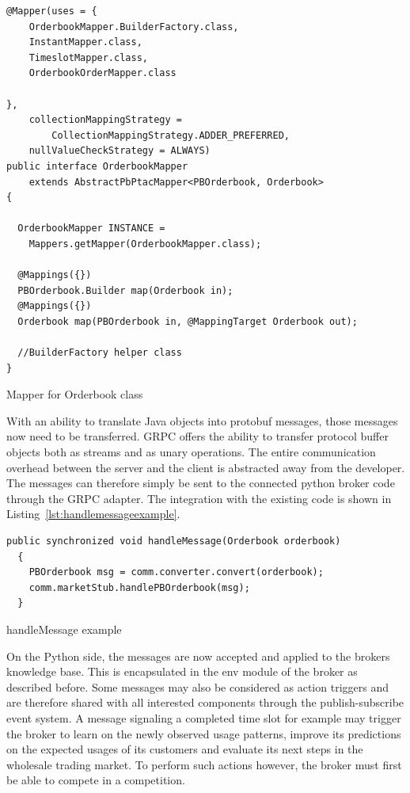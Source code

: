 \begin{listing}[]
    \begin{verbatim}
@Mapper(uses = {
    OrderbookMapper.BuilderFactory.class,
    InstantMapper.class,
    TimeslotMapper.class,
    OrderbookOrderMapper.class

},
    collectionMappingStrategy =
        CollectionMappingStrategy.ADDER_PREFERRED,
    nullValueCheckStrategy = ALWAYS)
public interface OrderbookMapper
    extends AbstractPbPtacMapper<PBOrderbook, Orderbook>
{

  OrderbookMapper INSTANCE =
    Mappers.getMapper(OrderbookMapper.class);

  @Mappings({})
  PBOrderbook.Builder map(Orderbook in);
  @Mappings({})
  Orderbook map(PBOrderbook in, @MappingTarget Orderbook out);

  //BuilderFactory helper class
}
    \end{verbatim}
    \caption{Mapper for Orderbook class}
    \label{lst:mapperexample}
\end{listing}

With an ability to translate Java objects into protobuf messages, those messages now need to be transferred. \ac{GRPC}
offers the ability to transfer protocol buffer objects both as streams and as unary operations. The entire communication
overhead between the server and the client is abstracted away from the developer. The messages can therefore simply be
sent to the connected python broker code through the \ac{GRPC} adapter. The integration with the existing code is shown
in Listing~\ref{lst:handlemessageexample}.

\begin{listing}
    \begin{verbatim}
public synchronized void handleMessage(Orderbook orderbook)
  {
    PBOrderbook msg = comm.converter.convert(orderbook);
    comm.marketStub.handlePBOrderbook(msg);
  }
    \end{verbatim}
    \caption{handleMessage example}
    \label{lst:handlemessageexample}
\end{listing}

On the Python side, the messages are now accepted and applied to the brokers knowledge base. This is encapsulated in the
env module of the broker as described before. Some messages may also be considered as action triggers and are therefore
shared with all interested components through the publish-subscribe event system. A message signaling a completed
time slot for example may trigger the broker to learn on the newly observed usage patterns, improve its predictions on
the expected usages of its customers and evaluate its next steps in the wholesale trading market. To perform such
actions however, the broker must first be able to compete in a competition.

